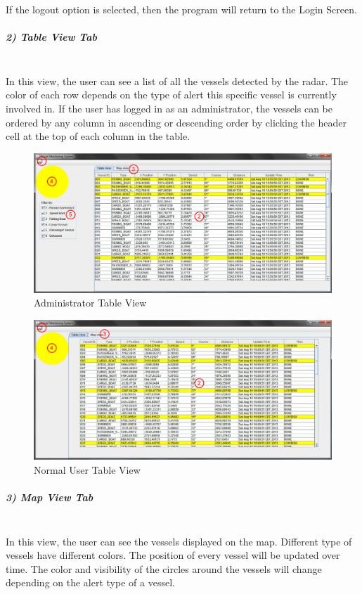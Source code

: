 \documentclass{article}
\begin{document}
If the logout option is selected, then the program will return to the Login Screen.\\

\pagebreak

\subparagraph{2) Table View Tab \\ \\}
In this view, the user can see a list of all the vessels detected by the radar. The color of each row depends on the type of alert this specific vessel is currently involved in. If the user has logged in as an administrator, the vessels can be ordered by any column in ascending or descending order by clicking the header cell at the top of each column in the table.

	\begin{figure}[!htb]
	\caption{Administrator Table View}
	\centering
	\includegraphics[scale=0.4]{images/userManual2_admin.jpg}
	\end{figure}

	\begin{figure}[!htb]
	\caption{Normal User Table View}
	\centering
	\includegraphics[scale=0.4]{images/userManual2_user.jpg}
	\end{figure}

\break
\subparagraph{3) Map View Tab \\ \\}
In this view, the user can see the vessels displayed on the map. Different type of vessels have different colors. The position of every vessel will be updated over time. The color and visibility of the circles around the vessels will change depending on the alert type of a vessel.
	
\end{document}
